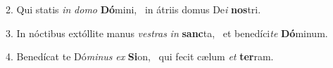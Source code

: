2. Qui statis \textit{in} \textit{do}\textit{mo} \textbf{Dó}mini, \ast\  in átriis domus De\textit{i} \textbf{nos}tri.\

3. In nóctibus extóllite manus \textit{ves}\textit{tras} \textit{in} \textbf{sanc}ta, \ast\  et benedíci\textit{te} \textbf{Dó}minum.\

4. Benedícat te Dó\textit{mi}\textit{nus} \textit{ex} \textbf{Si}on, \ast\  qui fecit cælum \textit{et} \textbf{ter}ram.\

